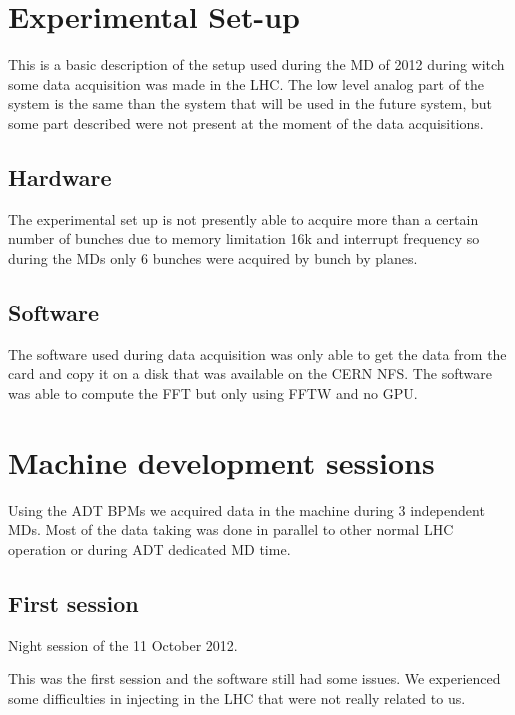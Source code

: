 \section{Experimental Set-up}

This is a basic description of the setup used during the \gls{MD} of 2012 during witch some data acquisition was made in the \gls{LHC}. The low level analog part of the system is the same than the system that will be used in the future system, but some part described were not present at the moment of the data acquisitions.

\subsection{Hardware}

The experimental set up is not presently able to acquire more than a certain number of bunches due to memory limitation 16k and interrupt frequency so during the \glspl{MD} only 6 bunches were acquired by bunch by planes.

\subsection{Software}

The software used during data acquisition was only able to get the data from the card and copy it on a disk that was available on the \gls{CERN} \gls{NFS}. The software was able to compute the \gls{FFT} but only using \gls{FFTW} and no \gls{GPU}.

\section{Machine development sessions}

Using the \gls{ADT} \glspl{BPM} we acquired data in the machine during 3 independent \glspl{MD}. Most of the data taking was done in parallel to other normal LHC operation or during \gls{ADT} dedicated \gls{MD} time.

\subsection{First session}

Night session of the 11 October 2012.

This was the first session and the software still had some issues. We experienced some difficulties in injecting in the \gls{LHC} that were not really related to us.

